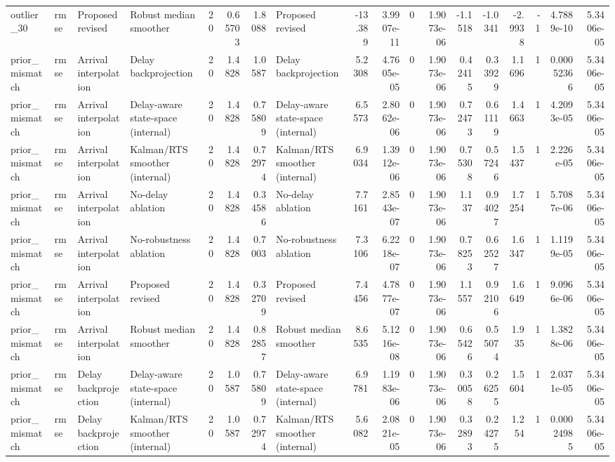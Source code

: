 \begin{table}[!htbp]
{\begin{tabular}{llllrrrlrrrrrrrrrr}
outlier_30 & rmse & Proposed revised & Robust median smoother & 20 & 0.65703 & 1.8088 & Proposed revised & -13.389 & 3.9907e-11 & 0 & 1.9073e-06 & -1.1518 & -1.0341 & -2.9938 & -1 & 4.7889e-10 & 5.3406e-05 \\
prior_mismatch & rmse & Arrival interpolation & Delay backprojection & 20 & 1.4828 & 1.0587 & Delay backprojection & 5.2308 & 4.7605e-05 & 0 & 1.9073e-06 & 0.42415 & 0.33929 & 1.1696 & 1 & 0.00052366 & 5.3406e-05 \\
prior_mismatch & rmse & Arrival interpolation & Delay-aware state-space (internal) & 20 & 1.4828 & 0.75809 & Delay-aware state-space (internal) & 6.5573 & 2.8062e-06 & 0 & 1.9073e-06 & 0.72473 & 0.61119 & 1.4663 & 1 & 4.2093e-05 & 5.3406e-05 \\
prior_mismatch & rmse & Arrival interpolation & Kalman/RTS smoother (internal) & 20 & 1.4828 & 0.72974 & Kalman/RTS smoother (internal) & 6.9034 & 1.3912e-06 & 0 & 1.9073e-06 & 0.75308 & 0.57246 & 1.5437 & 1 & 2.226e-05 & 5.3406e-05 \\
prior_mismatch & rmse & Arrival interpolation & No-delay ablation & 20 & 1.4828 & 0.34586 & No-delay ablation & 7.7161 & 2.8543e-07 & 0 & 1.9073e-06 & 1.137 & 0.94027 & 1.7254 & 1 & 5.7087e-06 & 5.3406e-05 \\
prior_mismatch & rmse & Arrival interpolation & No-robustness ablation & 20 & 1.4828 & 0.7003 & No-robustness ablation & 7.3106 & 6.2218e-07 & 0 & 1.9073e-06 & 0.78253 & 0.62527 & 1.6347 & 1 & 1.1199e-05 & 5.3406e-05 \\
prior_mismatch & rmse & Arrival interpolation & Proposed revised & 20 & 1.4828 & 0.32709 & Proposed revised & 7.4456 & 4.7877e-07 & 0 & 1.9073e-06 & 1.1557 & 0.92106 & 1.6649 & 1 & 9.0966e-06 & 5.3406e-05 \\
prior_mismatch & rmse & Arrival interpolation & Robust median smoother & 20 & 1.4828 & 0.82857 & Robust median smoother & 8.6535 & 5.1216e-08 & 0 & 1.9073e-06 & 0.65426 & 0.55074 & 1.935 & 1 & 1.3828e-06 & 5.3406e-05 \\
prior_mismatch & rmse & Delay backprojection & Delay-aware state-space (internal) & 20 & 1.0587 & 0.75809 & Delay-aware state-space (internal) & 6.9781 & 1.1983e-06 & 0 & 1.9073e-06 & 0.30058 & 0.26255 & 1.5604 & 1 & 2.0371e-05 & 5.3406e-05 \\
prior_mismatch & rmse & Delay backprojection & Kalman/RTS smoother (internal) & 20 & 1.0587 & 0.72974 & Kalman/RTS smoother (internal) & 5.6082 & 2.0821e-05 & 0 & 1.9073e-06 & 0.32893 & 0.24275 & 1.254 & 1 & 0.00024985 & 5.3406e-05 \\

\end{tabular}}
\end{table}

